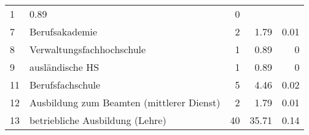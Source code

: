 \begin{longtable}{lXrrr}
       \num{1} &
       \num[round-mode=places,round-precision=2]{0,89} &
         \num[round-mode=places,round-precision=2]{0} \\

     7 &
     \multicolumn{1}{X}{ Berufsakademie   } &


       \num{2} &
       \num[round-mode=places,round-precision=2]{1,79} &
         \num[round-mode=places,round-precision=2]{0,01} \\

     8 &
     \multicolumn{1}{X}{ Verwaltungsfachhochschule   } &


       \num{1} &
       \num[round-mode=places,round-precision=2]{0,89} &
         \num[round-mode=places,round-precision=2]{0} \\

     9 &
     \multicolumn{1}{X}{ ausländische HS   } &


       \num{1} &
       \num[round-mode=places,round-precision=2]{0,89} &
         \num[round-mode=places,round-precision=2]{0} \\

     11 &
     \multicolumn{1}{X}{ Berufsfachschule   } &


       \num{5} &
       \num[round-mode=places,round-precision=2]{4,46} &
         \num[round-mode=places,round-precision=2]{0,02} \\

     12 &
     \multicolumn{1}{X}{ Ausbildung zum Beamten (mittlerer Dienst)   } &


       \num{2} &
       \num[round-mode=places,round-precision=2]{1,79} &
         \num[round-mode=places,round-precision=2]{0,01} \\

     13 &
     \multicolumn{1}{X}{ betriebliche Ausbildung (Lehre)   } &


       \num{40} &
       \num[round-mode=places,round-precision=2]{35,71} &
         \num[round-mode=places,round-precision=2]{0,14} \\


\end{longtable}
